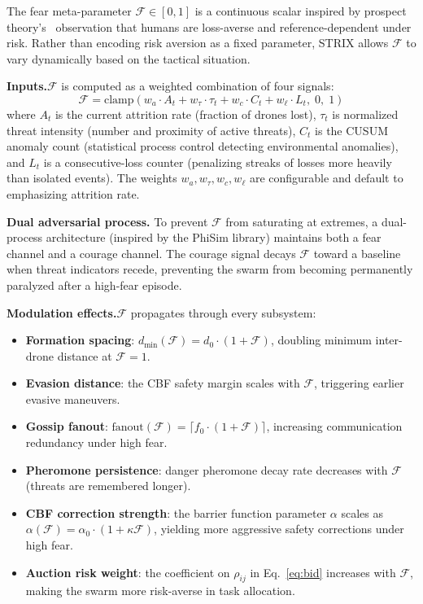 \documentclass[conference]{IEEEtran}
\newcommand{\fear}{\mathcal{F}}
\begin{document}
The fear meta-parameter $\fear \in [0,1]$ is a continuous scalar
inspired by prospect theory's~\cite{kahneman1979prospect}
observation that humans are loss-averse and reference-dependent under
risk.  Rather than encoding risk aversion as a fixed parameter,
STRIX allows $\fear$ to vary dynamically based on the tactical
situation.

\textbf{Inputs.}\quad  $\fear$ is computed as a weighted combination
of four signals:
\begin{equation}
\label{eq:fear}
  \fear = \text{clamp}\!\left(
    w_a \cdot A_t + w_\tau \cdot \tau_t + w_c \cdot C_t + w_\ell \cdot L_t,
    \;0,\;1\right)
\end{equation}
where $A_t$ is the current attrition rate (fraction of drones lost),
$\tau_t$ is normalized threat intensity (number and proximity of
active threats), $C_t$ is the CUSUM anomaly count (statistical
process control detecting environmental anomalies), and $L_t$ is a
consecutive-loss counter (penalizing streaks of losses more heavily
than isolated events).  The weights $w_a, w_\tau, w_c, w_\ell$ are
configurable and default to emphasizing attrition rate.

\textbf{Dual adversarial process.}\quad
To prevent $\fear$ from saturating at extremes, a dual-process
architecture (inspired by the PhiSim library) maintains both a fear
channel and a courage channel.  The courage signal decays $\fear$
toward a baseline when threat indicators recede, preventing the
swarm from becoming permanently paralyzed after a high-fear episode.

\textbf{Modulation effects.}\quad  $\fear$ propagates through every
subsystem:
\begin{itemize}
\setlength{\itemsep}{0pt}
  \item \textbf{Formation spacing}: $d_{\min}(\fear) = d_0 \cdot
    (1 + \fear)$, doubling minimum inter-drone distance at $\fear=1$.
  \item \textbf{Evasion distance}: the CBF safety margin scales with
    $\fear$, triggering earlier evasive maneuvers.
  \item \textbf{Gossip fanout}: $\text{fanout}(\fear) =
    \lceil f_0 \cdot (1 + \fear) \rceil$, increasing communication
    redundancy under high fear.
  \item \textbf{Pheromone persistence}: danger pheromone decay rate
    decreases with $\fear$ (threats are remembered longer).
  \item \textbf{CBF correction strength}: the barrier function
    parameter $\alpha$ scales as $\alpha(\fear) = \alpha_0 \cdot
    (1 + \kappa \fear)$, yielding more aggressive safety corrections
    under high fear.
  \item \textbf{Auction risk weight}: the coefficient on $\rho_{ij}$
    in Eq.~\ref{eq:bid} increases with $\fear$, making the swarm
    more risk-averse in task allocation.
\end{itemize}
\end{document}
